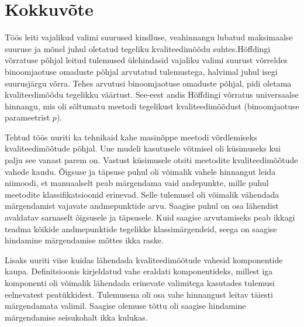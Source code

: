 \section{Kokkuvõte}
Töös leiti vajalikud valimi suurused kindluse, veahinnangu lubatud maksimaalse suuruse ja mõnel juhul oletatud tegeliku kvaliteedimõõdu suhtes.Höffdingi võrratuse põhjal leitud tulemused ülehindasid vajaliku valimi suurust võrreldes binoomjaotuse omaduste põhjal arvutatud tulemustega, halvimal juhul isegi suurusjärgu võrra. Tehes arvutusi binoomjaotuse omaduste põhjal, pidi oletama kvaliteedimõõdu tegelikku väärtust. See-eest andis Höffdingi võrratus universaalse hinnangu, mis oli sõltumatu meetodi tegelikust kvaliteedimõõdust (binoomjaotuse parameetrist $p$).

Tehtud töös uuriti ka tehnikaid kahe masinõppe meetodi võrdlemiseks kvaliteedimõõtude põhjal. Uue mudeli kasutusele võtmisel oli küsimuseks kui palju see vanast parem on. Vastust küsimusele otsiti meetodite kvaliteedimõõtude vahede kaudu. Õigsuse ja täpsuse puhul oli võimalik vahele hinnangut leida niimoodi, et manuaalselt peab märgendama vaid andepunkte, mille puhul meetodite klassifikatsioonid erinevad. Selle tulemusel oli võimalik vähendada märgendamist vajavate andmepunktide arvu. Saagise puhul on osa lähendist avaldatav sarnaselt õigsusele ja täpsusele. Kuid saagise arvutamiseks peab ikkagi teadma kõikide andmepunktide tegelikke klassimärgendeid, seega on saagise hindamine märgendamise mõttes ikka raske.

Lisaks uuriti viise kuidas lähendada kvaliteedimõõtude vahesid komponentide kaupa. Definitsioonis kirjeldatud vahe eraldati komponentideks, millest iga komponenti oli võimalik lähendada erinevate valimitega kasutades tulemusi eelnevatest peatükkidest. Tulemusena oli osa vahe hinnangust leitav täiesti märgendamata valimil. Saagise olemuse tõttu oli saagise hindamine märgendamise seisukohalt ikka kulukas.